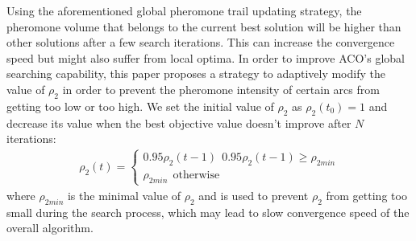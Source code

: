 Using the aforementioned global pheromone trail updating strategy, the pheromone volume that belongs to the current best solution will be higher than other solutions after a few search iterations.
This can increase the convergence speed but might also suffer from local optima.
In order to improve ACO's global searching capability, this paper proposes a strategy to adaptively modify the value of $\rho_2$ in order to prevent the pheromone intensity of certain arcs from getting too low or too high.
We set the initial value of $\rho_2$ as $\rho_2(t_0) = 1$ and decrease its value when the best objective value doesn't improve after $N$ iterations:
\begin{align}
	\rho_2(t) = \begin{cases}
	0.95 \rho_2(t - 1) \ \ 0.95 \rho_2(t - 1) \geq \rho_{2 min} \\
	\rho_{2min}  \ \ \text{otherwise}
	\end{cases} \label{formula11}
\end{align}
where $\rho_{2min}$ is the minimal value of $\rho_2$ and is used to prevent $\rho_2$ from getting too small during the search process, which may lead to slow convergence speed of the overall algorithm.



